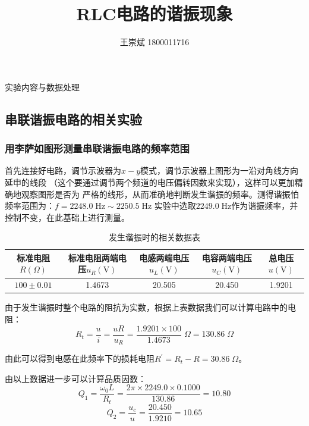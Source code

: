 \documentclass[a4paper]{ctexart}
\title{\textbf{RLC电路的谐振现象}}
\author{王崇斌 1800011716}
\date{}
\makeatletter
\def\V{\mathrm{V}}
\renewcommand{\section}{\@startsection{section}{1}{0mm}
	{-\baselineskip}{0.5\baselineskip}{\bf\leftline}}
\makeatother
\begin{document}
	\pagestyle{fancy}
	\chead{}
	\rhead{}
	\maketitle
    \thispagestyle{fancy}
    \section{\large{实验内容与数据处理}}
    \subsection{串联谐振电路的相关实验}
    \subsubsection{用李萨如图形测量串联谐振电路的频率范围}
    \par 
    首先连接好电路，调节示波器为$x-y$模式，调节示波器上图形为一沿对角线方向延申的线段
    （这个要通过调节两个频道的电压偏转因数来实现），这样可以更加精确地观察图形是否为
    严格的线形，从而准确地判断发生谐振的频率。测得谐振怕频率范围为：$f = 2248.0\;\mathrm{Hz} \sim 2250.5\;\mathrm{Hz}$
    实验中选取$2249.0\;\mathrm{Hz}$作为谐振频率，并控制不变，在此基础上进行测量。
    \begin{table}[htbp]
        \centering
        \caption{发生谐振时的相关数据表}
        \begin{tabular}{ccccc}
            \toprule[1.5pt]
            标准电阻$R(\Omega)$ & 标准电阻两端电压$u_{R}(\V)$ & 电感两端电压$u_{L}(\V)$ & 电容两端电压$u_{C}(\V)$ & 总电压$u(\V)$\\
            \midrule
            $100 \pm 0.01$ & 1.4673 & 20.505 & 20.450 & 1.9201\\
            \bottomrule[1.5pt]
        \end{tabular}
    \end{table}
    \par 
    由于发生谐振时整个电路的阻抗为实数，根据上表数据我们可以计算电路中的电阻：
    $$
    R_{t} = \frac{u}{i} =\frac{u R}{u_{R}} = \frac{1.9201\times 100}{1.4673}\;\Omega = 130.86\;\Omega
    $$
    \par 
    由此可以得到电感在此频率下的损耗电阻$R^{'} = R_{t} - R = 30.86\;\Omega$。
    \par 
    由以上数据进一步可以计算品质因数：
    $$
    Q_{1} = \frac{\omega_{0}L}{R_{t}} = \frac{2\pi\times 2249.0 \times 0.1000}{130.86} = 10.80
    $$
    $$
    Q_{2} = \frac{u_{c}}{u} = \frac{20.450}{1.9210} = 10.65
    $$
\end{document}
